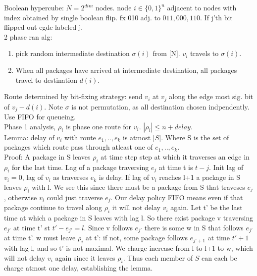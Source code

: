 \documentclass[a4paper]{article}
\begin{document}
Boolean hypercube: \(N=2^{dim}\) nodes. node \(i \in \{0,1\}^n\) adjacent to nodes with index obtained by single boolean flip. fx 010 adj. to \(011,000,110\). If j'th bit flipped out egde labeled j.\\
2 phase ran alg:
\begin{enumerate}
\item pick random intermediate destination \(\sigma(i)\) from [N]. \(v_i\) travels to \(\sigma(i)\).
\item When all packages have arrived at intermediate destination, all packages travel to destination \(d(i)\).
\end{enumerate}
Route determined by bit-fixing strategy: send \(v_i\) at \(v_j\) along the edge most sig. bit of \(v_j - d(i)\). Note \(\sigma\) is not permutation, as all destination chosen indpendently. Use FIFO for queueing.\\
Phase 1 analysis, \(\rho_i\) is phase one route for \(v_i\). \(|\rho_i| \leq n+delay\).\\
Lemma: delay of \(v_i\) with route \(e_1,..,e_k\) is atmost \(|S|\). Where S is the set of packages which route pass through atleast one of \(e_1,..,e_k\).\\
Proof: A package in S leaves \(\rho_i\) at time step step at which it traverses an edge in \(\rho_i\) for the last time. Lag of a package traversing \(e_j\) at time t is \(t-j\). Init lag of \(v_i=0\), lag of \(v_i\) as traverses \(e_k\) is delay. If lag of \(v_i\) reaches l+1 a package in S leaves \(\rho_i\) with l. We see this since there must be a package from S that traveses \(e_j\), otherwise \(v_i\) could just traverse \(e_j\). Our delay policy FIFO means even if that package continue to travel along \(\rho_i\) it will not delay \(v_i\) again.  Let t' be the last time at which a package in S leaves with lag l. So there exist package v traversing \(e_{j'}\) at time t' st \(t'-e_{j'} = l\). Since v follows \(e_{j'}\) there is some w in S that follows \(e_{j'}\) at time t'. w must leave \(\rho_i\) at t': if not, some package follows \(e_{j'+1}\) at time \(t'+1\) with lag l, and so t' is not maximal. We charge increase from l to l+1 to w, which will not delay \(v_i\) again since it leaves \(\rho_i\). Thus each member of \(S\) can each be charge atmost one delay, establishing the lemma. 
\end{document}
